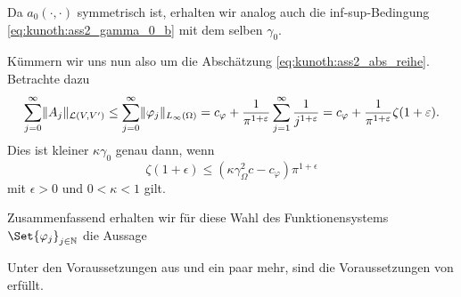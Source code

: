 \begin{Satz}
\begin{Beweis}
        Da $a_{0}(\cdot, \cdot)$ symmetrisch ist, erhalten wir analog auch die inf-sup-Bedingung \eqref{eq:kunoth:ass2_gamma_0_b} mit dem selben $\gamma_{0}$.

        Kümmern wir uns nun also um die Abschätzung \eqref{eq:kunoth:ass2_abs_reihe}.
        Betrachte dazu
        \begin{align}
                    \sum_{j = 0}^{\infty} \lVert A_{j}\rVert_{\mathcal L(V, V')}
            \leq    \sum_{j = 0}^{\infty} \lVert\varphi_{j}\rVert_{L_{\infty}(\Omega)}
            =       c_{\varphi} + \frac{1}{\pi^{1+\varepsilon}} \sum_{j = 1}^{\infty} \frac{1}{j^{1+\varepsilon}}
            = c_{\varphi} + \frac{1}{\pi^{1+\varepsilon}} \zeta(1+\varepsilon).
        \end{align}
        Dies ist kleiner $\kappa \gamma_{0}$ genau dann, wenn
        \begin{equation}
            \zeta(1+ \epsilon) \leq (\kappa \gamma_{\Omega}^{2} c - c_{\varphi}) \pi^{1+\epsilon}
        \end{equation}
        mit $\epsilon > 0$ und $0 < \kappa < 1$ gilt.
    \end{Beweis}
\end{Satz}

Zusammenfassend erhalten wir für diese Wahl des Funktionensystems $\Set{ \varphi_{j} }_{j \in \mathbb{N}}$ die Aussage

\begin{Korollar}
    Unter den Voraussetzungen aus  und ein paar mehr, sind die Voraussetzungen von  erfüllt.
\end{Korollar}


